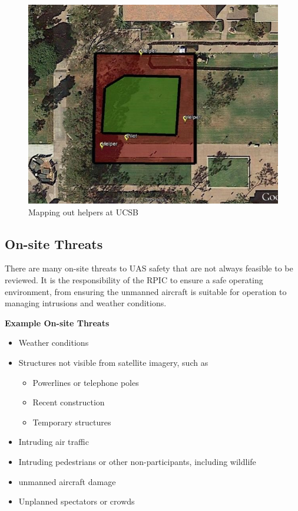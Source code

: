 \documentclass[
]{book}
\providecommand{\tightlist}{%
  \setlength{\itemsep}{0pt}\setlength{\parskip}{0pt}}
\begin{document}
\begin{figure}

{\centering \includegraphics[width=1\linewidth]{images/Mission_Planning_UCSB} 

}

\caption{Mapping out helpers at UCSB}\label{fig:MP-UCSB}
\end{figure}

\hypertarget{on-site-threats}{%
\subsection{On-site Threats}\label{on-site-threats}}

There are many on-site threats to UAS safety that are not always feasible to be reviewed. It is the responsibility of the RPIC to ensure a safe operating environment, from ensuring the unmanned aircraft is suitable for operation to managing intrusions and weather conditions.

\textbf{Example On-site Threats}

\begin{itemize}
\item
  Weather conditions
\item
  Structures not visible from satellite imagery, such as

  \begin{itemize}
  \tightlist
  \item
    Powerlines or telephone poles
  \item
    Recent construction
  \item
    Temporary structures
  \end{itemize}
\item
  Intruding air traffic
\item
  Intruding pedestrians or other non-participants, including wildlife
\item
  unmanned aircraft damage
\item
  Unplanned spectators or crowds
\end{itemize}
\end{document}
